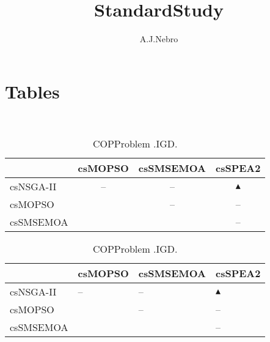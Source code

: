 \documentclass{article}
\title{StandardStudy}
\author{A.J.Nebro}
\begin{document}
\maketitle
\section{Tables}
\
\begin{table}
\caption{
COPProblem
.IGD.}
\label{Table:
COPProblem
.IGD.}
\centering
\begin{scriptsize}
\begin{tabular}{
lccc
}
\hline  & csMOPSO & csSMSEMOA & csSPEA2\\ 
\hline 
csNSGA-II
 & 
--
 & 
--
 & 
$\blacktriangle$
 \\ 
csMOPSO
 & 
  
 & 
--
 & 
--
 \\ 
csSMSEMOA
 & 
 
 & 
  
 & 
--
 \\ 
\hline
\end{tabular}
\end{scriptsize}
\end{table}
\begin{table}
\caption{
COPProblem 
.IGD.}
\label{Table:
COPProblem 
.IGD.}
\centering
\begin{scriptsize}
\begin{tabular}{
| l | p{0.15cm}   | p{0.15cm}   | p{0.15cm}   | 
}
\hline \multicolumn{1}{|c|}{} & \multicolumn{1}{c|}{csMOPSO} & \multicolumn{1}{c|}{csSMSEMOA} & \multicolumn{1}{c|}{csSPEA2} \\
\hline 
csNSGA-II
 & 
--
 & 
--
 & 
$\blacktriangle$
 \\ 
csMOPSO
 & 
  
 & 
--
 & 
--
 \\ 
csSMSEMOA
 & 
 
 & 
  
 & 
--
 \\ 
\hline
\end{tabular}
\end{scriptsize}
\end{table}
\end{document}
